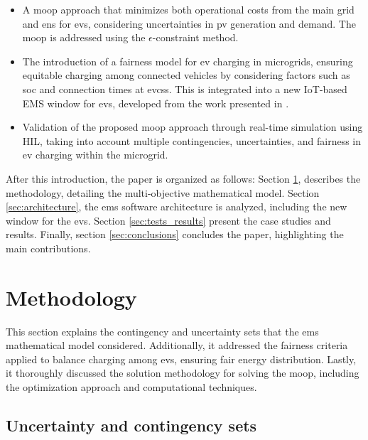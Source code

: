 \documentclass[preprint, 12pt, 3p]{elsarticle}
\begin{document}
\begin{itemize}
    \item A \gls{moop} approach that minimizes both operational costs from the 
    main grid and \gls{ens} for \glspl{ev}, considering uncertainties in 
    \gls{pv} generation and demand. The \gls{moop} is addressed using the 
    $\epsilon$-constraint method.

    \item  The introduction of a fairness model for \gls{ev} charging in 
    microgrids, ensuring equitable charging among connected vehicles by 
    considering factors such as \gls{soc} and connection times at \glspl{evcs}. 
    This is integrated into a new IoT-based EMS window for \glspl{ev}, developed
    from the work presented in \cite{silva2023}.

    \item Validation of the proposed \gls{moop} approach through real-time 
    simulation using HIL, taking into account multiple contingencies, 
    uncertainties, and fairness in \gls{ev} charging within the microgrid.

\end{itemize} 

After this introduction, the paper is organized as follows:
Section \ref{sec:methodology}, describes the methodology, detailing the 
multi-objective mathematical model. 
Section \ref{sec:architecture}, the \gls{ems} software architecture is analyzed, 
including the new window for the \glspl{ev}. Section \ref{sec:tests_results} 
present the case studies and results. 
Finally, section \ref{sec:conclusions} concludes the paper, 
highlighting the main contributions.

\section{Methodology}\label{sec:methodology}

This section explains the contingency and uncertainty sets that the \gls{ems} mathematical model considered. Additionally, it addressed the fairness criteria applied to balance charging among \glspl{ev}, ensuring fair energy distribution. Lastly, it thoroughly discussed the solution methodology for solving the \gls{moop}, including the optimization approach and computational techniques.

\subsection{Uncertainty and contingency sets}\label{sec:uncertainty_set}
\end{document}
